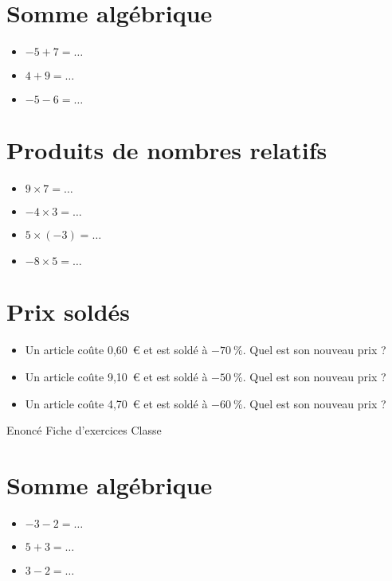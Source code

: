 \documentclass[a4paper,11pt,fleqn]{article}
\begin{document}
\section{Somme algébrique}
\begin{itemize}

  \item $-5 +7=\ldots$
  \item $4 +9=\ldots$
  \item $-5 -6=\ldots$
\end{itemize}


\section{Produits de nombres relatifs}
\begin{itemize}

  \item $9\times7=\ldots$
  \item $-4\times3=\ldots$
  \item $5\times(-3)=\ldots$
  \item $-8\times5=\ldots$
\end{itemize}


\section{Prix soldés}
\begin{itemize}

  \item Un article coûte 0,60~€ et est soldé à $-70~\%$. Quel est son nouveau prix ?
  \item Un article coûte 9,10~€ et est soldé à $-50~\%$. Quel est son nouveau prix ?
  \item Un article coûte 4,70~€ et est soldé à $-60~\%$. Quel est son nouveau prix ?
\end{itemize}
\newpage
\setcounter{exo}{0}
\setcounter{section}{0}
{Enoncé} \hfill {\huge Fiche d'exercices } \hfill {Classe}

\section{Somme algébrique}
\begin{itemize}

  \item $-3 -2=\ldots$
  \item $5 +3=\ldots$
  \item $3 -2=\ldots$
\end{itemize}
\end{document}
